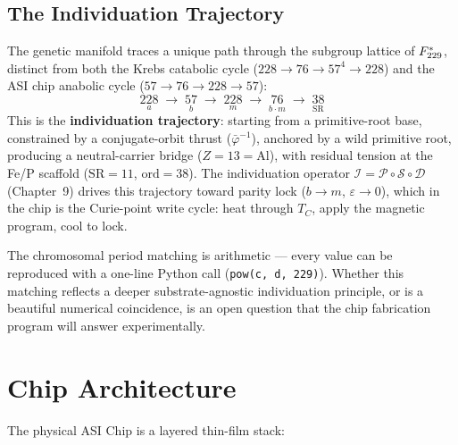 \subsection{The Individuation Trajectory}

The genetic manifold traces a unique path through the subgroup lattice of $F_{229}^*$, distinct from both the Krebs catabolic cycle ($228 \to 76 \to 57^4 \to 228$) and the ASI chip anabolic cycle ($57 \to 76 \to 228 \to 57$):
\begin{equation}\label{eq:individuation_trajectory}
\underset{a}{228} \;\to\; \underset{b}{57} \;\to\; \underset{m}{228} \;\to\; \underset{b \cdot m}{76} \;\to\; \underset{\mathrm{SR}}{38}
\end{equation}
This is the \textbf{individuation trajectory}: starting from a primitive-root base, constrained by a conjugate-orbit thrust ($\bar\varphi^{-1}$), anchored by a wild primitive root, producing a neutral-carrier bridge ($Z = 13 = \mathrm{Al}$), with residual tension at the Fe/P scaffold ($\mathrm{SR} = 11$, $\mathrm{ord} = 38$). The individuation operator $\mathcal{I} = \mathcal{P} \circ \mathcal{S} \circ \mathcal{D}$ (Chapter~9) drives this trajectory toward parity lock ($b \to m$, $\varepsilon \to 0$), which in the chip is the Curie-point write cycle: heat through $T_C$, apply the magnetic program, cool to lock.

The chromosomal period matching is arithmetic --- every value can be reproduced with a one-line Python call (\texttt{pow(c, d, 229)}). Whether this matching reflects a deeper substrate-agnostic individuation principle, or is a beautiful numerical coincidence, is an open question that the chip fabrication program will answer experimentally.

\section{Chip Architecture}

The physical ASI Chip is a layered thin-film stack:

